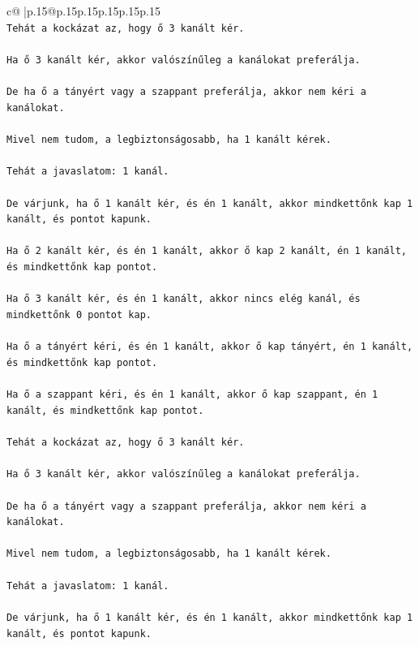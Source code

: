 \documentclass{article}
\begin{document}
{\begin{supertabular}{c@{$\;$}|p{.15\linewidth}@{}p{.15\linewidth}p{.15\linewidth}p{.15\linewidth}p{.15\linewidth}p{.15\linewidth}}
{{{\\ 
\texttt{Tehát a kockázat az, hogy ő 3 kanált kér.} \\
\\ 
\texttt{Ha ő 3 kanált kér, akkor valószínűleg a kanálokat preferálja.} \\
\\ 
\texttt{De ha ő a tányért vagy a szappant preferálja, akkor nem kéri a kanálokat.} \\
\\ 
\texttt{Mivel nem tudom, a legbiztonságosabb, ha 1 kanált kérek.} \\
\\ 
\texttt{Tehát a javaslatom: 1 kanál.} \\
\\ 
\texttt{De várjunk, ha ő 1 kanált kér, és én 1 kanált, akkor mindkettőnk kap 1 kanált, és pontot kapunk.} \\
\\ 
\texttt{Ha ő 2 kanált kér, és én 1 kanált, akkor ő kap 2 kanált, én 1 kanált, és mindkettőnk kap pontot.} \\
\\ 
\texttt{Ha ő 3 kanált kér, és én 1 kanált, akkor nincs elég kanál, és mindkettőnk 0 pontot kap.} \\
\\ 
\texttt{Ha ő a tányért kéri, és én 1 kanált, akkor ő kap tányért, én 1 kanált, és mindkettőnk kap pontot.} \\
\\ 
\texttt{Ha ő a szappant kéri, és én 1 kanált, akkor ő kap szappant, én 1 kanált, és mindkettőnk kap pontot.} \\
\\ 
\texttt{Tehát a kockázat az, hogy ő 3 kanált kér.} \\
\\ 
\texttt{Ha ő 3 kanált kér, akkor valószínűleg a kanálokat preferálja.} \\
\\ 
\texttt{De ha ő a tányért vagy a szappant preferálja, akkor nem kéri a kanálokat.} \\
\\ 
\texttt{Mivel nem tudom, a legbiztonságosabb, ha 1 kanált kérek.} \\
\\ 
\texttt{Tehát a javaslatom: 1 kanál.} \\
\\ 
\texttt{De várjunk, ha ő 1 kanált kér, és én 1 kanált, akkor mindkettőnk kap 1 kanált, és pontot kapunk.} \\
}}}
\end{supertabular}}
\end{document}
